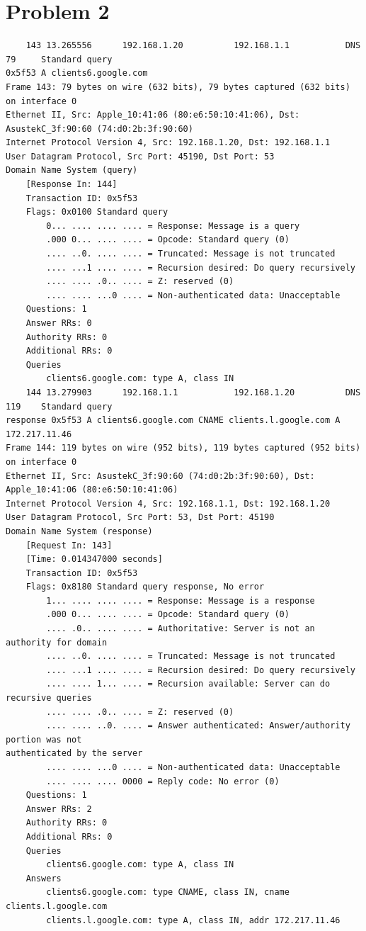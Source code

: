 \documentclass[letter,10pt]{article}
\begin{document}
\section{Problem 2}

\begin{verbatim}
    143 13.265556      192.168.1.20          192.168.1.1           DNS      79     Standard query
0x5f53 A clients6.google.com
Frame 143: 79 bytes on wire (632 bits), 79 bytes captured (632 bits) on interface 0
Ethernet II, Src: Apple_10:41:06 (80:e6:50:10:41:06), Dst: AsustekC_3f:90:60 (74:d0:2b:3f:90:60)
Internet Protocol Version 4, Src: 192.168.1.20, Dst: 192.168.1.1
User Datagram Protocol, Src Port: 45190, Dst Port: 53
Domain Name System (query)
    [Response In: 144]
    Transaction ID: 0x5f53
    Flags: 0x0100 Standard query
        0... .... .... .... = Response: Message is a query
        .000 0... .... .... = Opcode: Standard query (0)
        .... ..0. .... .... = Truncated: Message is not truncated
        .... ...1 .... .... = Recursion desired: Do query recursively
        .... .... .0.. .... = Z: reserved (0)
        .... .... ...0 .... = Non-authenticated data: Unacceptable
    Questions: 1
    Answer RRs: 0
    Authority RRs: 0
    Additional RRs: 0
    Queries
        clients6.google.com: type A, class IN
    144 13.279903      192.168.1.1           192.168.1.20          DNS      119    Standard query
response 0x5f53 A clients6.google.com CNAME clients.l.google.com A 172.217.11.46
Frame 144: 119 bytes on wire (952 bits), 119 bytes captured (952 bits) on interface 0
Ethernet II, Src: AsustekC_3f:90:60 (74:d0:2b:3f:90:60), Dst: Apple_10:41:06 (80:e6:50:10:41:06)
Internet Protocol Version 4, Src: 192.168.1.1, Dst: 192.168.1.20
User Datagram Protocol, Src Port: 53, Dst Port: 45190
Domain Name System (response)
    [Request In: 143]
    [Time: 0.014347000 seconds]
    Transaction ID: 0x5f53
    Flags: 0x8180 Standard query response, No error
        1... .... .... .... = Response: Message is a response
        .000 0... .... .... = Opcode: Standard query (0)
        .... .0.. .... .... = Authoritative: Server is not an authority for domain
        .... ..0. .... .... = Truncated: Message is not truncated
        .... ...1 .... .... = Recursion desired: Do query recursively
        .... .... 1... .... = Recursion available: Server can do recursive queries
        .... .... .0.. .... = Z: reserved (0)
        .... .... ..0. .... = Answer authenticated: Answer/authority portion was not
authenticated by the server
        .... .... ...0 .... = Non-authenticated data: Unacceptable
        .... .... .... 0000 = Reply code: No error (0)
    Questions: 1
    Answer RRs: 2
    Authority RRs: 0
    Additional RRs: 0
    Queries
        clients6.google.com: type A, class IN
    Answers
        clients6.google.com: type CNAME, class IN, cname clients.l.google.com
        clients.l.google.com: type A, class IN, addr 172.217.11.46
\end{verbatim}
\end{document}
